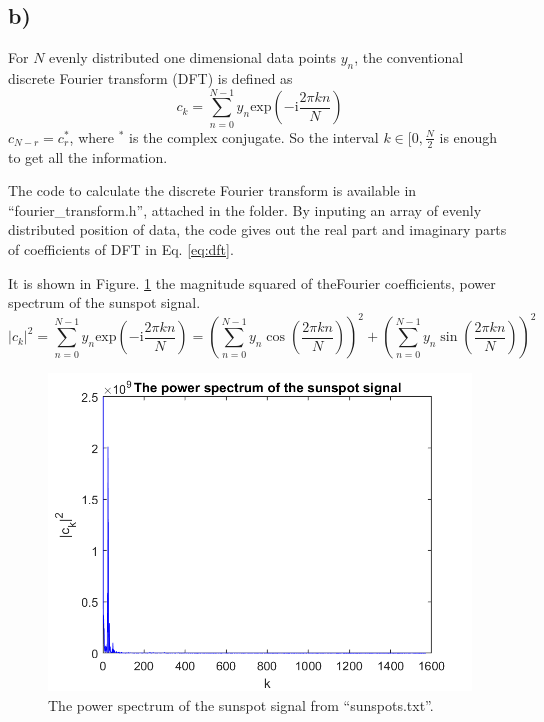 \documentclass[12pt, graphicx]{article}
\begin{document}
\subsection*{b)}
For $N$ evenly distributed one dimensional data points $y_n$, the conventional discrete Fourier transform (DFT) is defined as
\begin{equation}
c_k=\displaystyle\sum_{n=0}^{N-1}y_n\mathrm{exp}\left(-\mathrm{i}\frac{2\pi kn}{N}\right)
\label{eq:dft}
\end{equation}
$c_{N-r}=c_r^*$, where $^*$ is the complex conjugate. So the interval $k\in[0, \frac{N}{2}$ is enough to get all the information. \par
The code to calculate the discrete Fourier transform is available in \textquotedblleft fourier\_transform.h\textquotedblright, attached in the folder. By inputing an array of evenly distributed position of data, the code gives out the real part and imaginary parts of coefficients of DFT in Eq. \ref{eq:dft}.\par
It is shown in Figure. \ref{fig:dft} the magnitude squared of theFourier coefficients, power spectrum of the sunspot signal.
\begin{equation}
|c_k|^2=\displaystyle\sum_{n=0}^{N-1}y_n\mathrm{exp}\left(-\mathrm{i}\frac{2\pi kn}{N}\right)=\left(\displaystyle\sum_{n=0}^{N-1}y_n\cos\left(\frac{2\pi kn}{N}\right)\right)^2+\left(\displaystyle\sum_{n=0}^{N-1}y_n\sin\left(\frac{2\pi kn}{N}\right)\right)^2
\end{equation}

\begin{figure}[ht]
\centering
\includegraphics[width = 120mm]{powerspectrum.png}
\caption{The power spectrum of the sunspot signal from \textquotedblleft sunspots.txt\textquotedblright. }
\label{fig:dft}
\end{figure}
\end{document}
